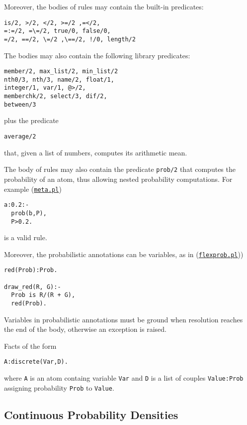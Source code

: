 Moreover, the bodies of rules may contain the built-in predicates:
\begin{verbatim}
is/2, >/2, </2, >=/2 ,=</2,
=:=/2, =\=/2, true/0, false/0,
=/2, ==/2, \=/2 ,\==/2, !/0, length/2
\end{verbatim}
The bodies may also contain the following
 library predicates:
\begin{verbatim}
member/2, max_list/2, min_list/2
nth0/3, nth/3, name/2, float/1,
integer/1, var/1, @>/2, 
memberchk/2, select/3, dif/2,
between/3
\end{verbatim}
plus the predicate
\begin{verbatim}
average/2
\end{verbatim}
that, given a list of numbers, computes its arithmetic mean.

The body of rules may also contain the predicate \verb|prob/2| that computes the
probability of an atom, thus allowing nested probability computations.
For example (\href{http://cplint.lamping.unife.it/example/inference/meta.pl}{\texttt{meta.pl}})
\begin{verbatim}
a:0.2:-
  prob(b,P),
  P>0.2.
\end{verbatim}
is a valid rule.

Moreover, the probabilistic annotations can be variables, as in 
(\href{http://cplint.lamping.unife.it/example/inference/flexprob.pl}{\texttt{flexprob.pl}}))
\begin{verbatim}
red(Prob):Prob.

draw_red(R, G):-
  Prob is R/(R + G),
  red(Prob).
\end{verbatim}
Variables in probabilistic annotations must be ground when resolution reaches the end of the body, 
otherwise an exception is raised.

Facts of the form
\begin{verbatim}
A:discrete(Var,D).
\end{verbatim}
where \verb|A| is an atom containg variable \verb|Var| and \verb|D|
is a list of couples \verb|Value:Prob| assigning probability \verb|Prob|
to \verb|Value|. 

\subsection{Continuous Probability Densities}
\label{cont}

